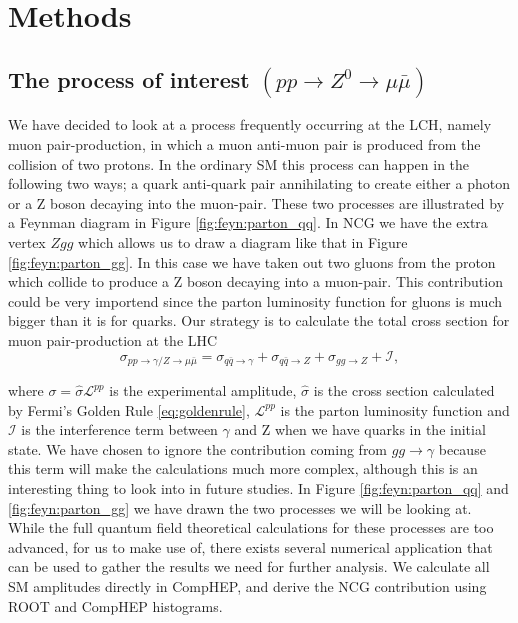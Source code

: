 \section{Methods}

\subsection{The process of interest $(pp \rightarrow Z^0 \rightarrow \mu \bar\mu)$}
We have decided to look at a process frequently occurring at the LCH, namely muon pair-production, in which a muon anti-muon pair is produced from the collision of two protons. In the ordinary SM this process can happen in the following two ways; a quark anti-quark pair annihilating to create either a photon or a Z boson decaying into the muon-pair. These two processes are illustrated by a Feynman diagram in Figure \ref{fig:feyn:parton_qq}. In NCG we have the extra vertex $Zgg$ which allows us to draw a diagram like that in Figure \ref{fig:feyn:parton_gg}. In this case we have taken out two gluons from the proton which collide to produce a Z boson decaying into a muon-pair. This contribution could be very importend since the parton luminosity function for gluons is much bigger than it is for quarks. Our strategy is to calculate the total cross section for muon pair-production at the LHC
\begin{equation}
	\sigma_{pp \rightarrow \gamma/ Z \rightarrow \mu \bar \mu} = \sigma_{q \bar q \rightarrow \gamma} + \sigma_{q \bar q \rightarrow Z} + \sigma_{gg \rightarrow Z} + \mathcal{I},
\end{equation}

where $\sigma =\hat \sigma \mathcal{L}^{pp}$ is the experimental amplitude, $\hat \sigma$ is the cross section calculated by Fermi's Golden Rule \eqref{eq:goldenrule}, $\mathcal{L}^{pp}$ is the parton luminosity function and $\mathcal{I}$ is the interference term between $\gamma$ and Z when we have quarks in the initial state. We have chosen to ignore the contribution coming from $gg \rightarrow \gamma$ because this term will make the calculations much more complex, although this is an interesting thing to look into in future studies. In Figure \ref{fig:feyn:parton_qq} and \ref{fig:feyn:parton_gg} we have drawn the two processes we will be looking at. While the full quantum field theoretical calculations for these processes are too advanced, for us to make use of, there exists several numerical application that can be used to gather the results we need for further analysis. We calculate all SM amplitudes directly in CompHEP, and derive the NCG contribution using ROOT and CompHEP histograms.

